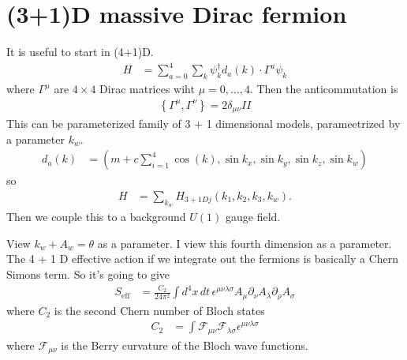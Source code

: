 \section{(3+1)D massive Dirac fermion}
It is useful to start in (4+1)D.
\begin{align}
    H &=
    \sum_{a=0}^{4}
    \sum_{k} \psi_k^\dagger d_a(k)\cdot \Gamma^a \psi_k
\end{align}
where $\Gamma^\mu$ are $4\times 4$ Dirac matrices wiht $\mu=0,\ldots,4$.
Then the anticommutation is
\begin{align}
    \left\{ \Gamma^{\mu}, \Gamma^{\nu} \right\} = 2\delta_{\mu\nu} II
\end{align}
This can be  parameterized family of 3 + 1 dimensional models,
parameetrized by a parameter $k_w$.
\begin{align}
    d_a(k) &=\left( 
    m +c \sum_{i=1}^{4}\cos(k),
    \sin k_x,
    \sin k_y,
    \sin k_z,
    \sin k_w
    \right)
\end{align}
so
\begin{align}
    H &= \sum_{k_w} H_{3+1Dj}(k_1,k_2,k_3,k_w).
\end{align}
Then we couple this to a background $U(1)$ gauge field.

View $k_w + A_w = \theta$ as a parameter.
I view this fourth dimension as a parameter.
The 4 + 1 D effective action if we integrate out the fermions is basically a
Chern Simons term.
So it's going to give
\begin{align}
    S_{\mathrm{eff}} &=
    \frac{C_2}{24\pi^2}
    \int d^4x\, dt\,
    \epsilon^{\mu\nu\lambda\sigma}
    A_{\mu} \partial_{\nu} A_{\lambda} \partial_{\rho} A_{\sigma}
\end{align}
where $C_2$ is the second Chern number of Bloch states
\begin{align}
    C_2 &=
    \int \mathcal{F}_{\mu\nu} \mathcal{F}_{\lambda\sigma}
    \epsilon^{\mu\nu\lambda\sigma}
\end{align}
where $\mathcal{F}_{\mu\nu}$ is the Berry curvature of the Bloch wave functions.
